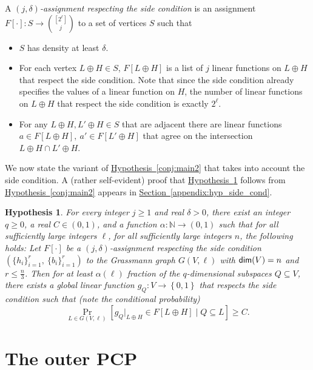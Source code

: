 \documentclass[11pt]{article}
\numberwithin{equation}{section}
\theoremstyle{definition}
\theoremstyle{plain}
\newcommand{\expref}[2]{\hyperref[#2]{#1~\ref{#2}}}
\newtheorem{conj}[theorem]{Hypothesis}
\newcommand\set[1]{{\left\{ #1 \right\}}}
\newcommand\Prob[2]{{\Pr_{#1}\left[ {#2} \right]}}
\newcommand*\xor{\mathbin{\oplus}}
\newcommand*\aconj[1]{\alpha{#1}}
\renewcommand\leq{\leqslant}
\begin{document}
A \emph{$(j,\delta)$-assignment respecting the side condition} %
%
 is an assignment $F[\cdot]: S \to {[2^\ell] \choose j}$ to a set of
vertices $S$ such that
\begin{itemize}
\item $S$ has density at least $\delta$.
\item For each vertex $L\xor H \in S$, $F[L\xor H]$ is a list of $j$ linear functions
on $L \xor H$ that respect the side condition. Note that since the side condition already specifies the values
of a linear function on $H$, the number of linear functions on $L\xor H$ that respect the side condition is
exactly $2^\ell$.
\item For any $L\xor H, L' \xor H \in S$ that are %
adjacent  %
there are linear functions
      $a \in F[L \xor H], ~a' \in F[L' \xor H]$ that agree on the intersection $L\xor H \cap L' \xor H$.
\end{itemize}

We now state the variant of \expref{Hypothesis}{conj:main2} that takes into account the side condition. A (rather self-evident) proof that
\expref{Hypothesis}{conj:main} follows from \expref{Hypothesis}{conj:main2} appears in \expref{Section}{appendix:hyp_side_cond}.
%
%
%

\begin{conj}\label{conj:main}
  For every integer $j \geqslant 1$ and %
real  %
$\delta>0$, there exist an integer $q \geqslant 0$, a %
real  %
$C \in (0,1)$, and a
  function $\aconj\colon \mathbb{N}\to(0,1)$
  such that
  for all sufficiently large integers $\ell$, for all sufficiently large integers $n$,  the following holds:
  Let $F[\cdot]$ be a $(j,\delta)$-assignment respecting the side condition $\left( \{ h_i \}_{i=1}^r, ~\{b_i\}_{i=1}^r \right)$
  to the Grassmann graph $G(V,\ell)$ with ${\sf dim}(V) = n$ and $r \leq \frac{n}{3}$.
  Then for at least $\aconj{(\ell)}$ fraction of the $q$-dimensional subspaces $Q \subseteq V$,
  there exists a global linear function $g_Q: V \to \set{0,1}$ that respects the side condition
  such that (note the conditional probability)
  \begin{equation} \label{eqn:global-fn-side} 
  \Prob{L \in G(V, \ell)}{g_Q|_{L\xor H}  \in F[L\xor H] \mid Q \subseteq L}\geqslant C.
  \end{equation}
\end{conj}




\section{The outer PCP}\label{section:outer_pcp_game}
\end{document}
